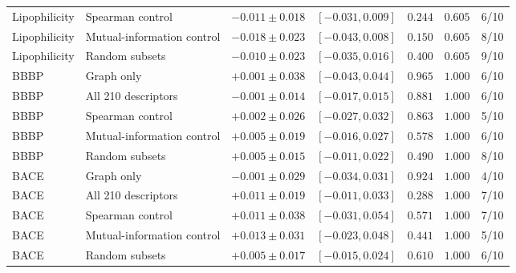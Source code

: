 \begin{table}[H]
\begin{tabular}{@{}llccccr@{}}
Lipophilicity & Spearman control & $-0.011\pm0.018$ & $[-0.031,0.009]$ & $0.244$ & $0.605$ & 6/10 \\
Lipophilicity & Mutual-information control & $-0.018\pm0.023$ & $[-0.043,0.008]$ & $0.150$ & $0.605$ & 8/10 \\
Lipophilicity & Random subsets & $-0.010\pm0.023$ & $[-0.035,0.016]$ & $0.400$ & $0.605$ & 9/10 \\
\midrule
BBBP & Graph only & $+0.001\pm0.038$ & $[-0.043,0.044]$ & $0.965$ & $1.000$ & 6/10 \\
BBBP & All 210 descriptors & $-0.001\pm0.014$ & $[-0.017,0.015]$ & $0.881$ & $1.000$ & 6/10 \\
BBBP & Spearman control & $+0.002\pm0.026$ & $[-0.027,0.032]$ & $0.863$ & $1.000$ & 5/10 \\
BBBP & Mutual-information control & $+0.005\pm0.019$ & $[-0.016,0.027]$ & $0.578$ & $1.000$ & 6/10 \\
BBBP & Random subsets & $+0.005\pm0.015$ & $[-0.011,0.022]$ & $0.490$ & $1.000$ & 8/10 \\
\midrule
BACE & Graph only & $-0.001\pm0.029$ & $[-0.034,0.031]$ & $0.924$ & $1.000$ & 4/10 \\
BACE & All 210 descriptors & $+0.011\pm0.019$ & $[-0.011,0.033]$ & $0.288$ & $1.000$ & 7/10 \\
BACE & Spearman control & $+0.011\pm0.038$ & $[-0.031,0.054]$ & $0.571$ & $1.000$ & 7/10 \\
BACE & Mutual-information control & $+0.013\pm0.031$ & $[-0.023,0.048]$ & $0.441$ & $1.000$ & 5/10 \\
BACE & Random subsets & $+0.005\pm0.017$ & $[-0.015,0.024]$ & $0.610$ & $1.000$ & 6/10 \\
\bottomrule
\end{tabular}
\end{table}
